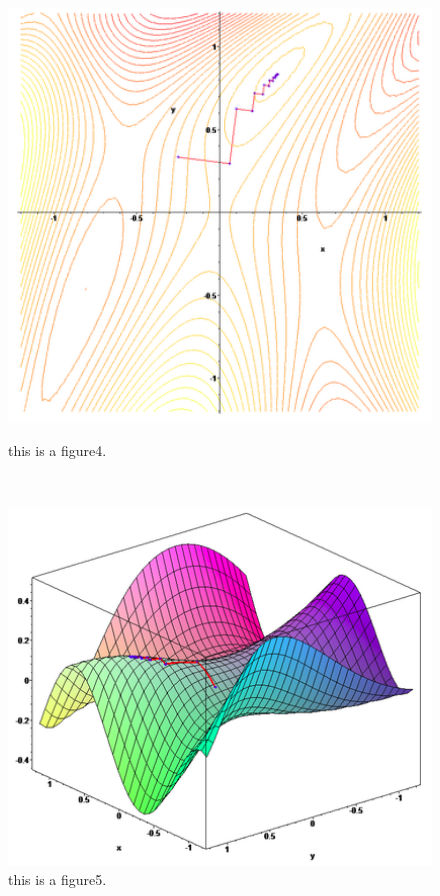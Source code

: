 \documentclass[12pt,a4paper]{article}
\begin{document}
\begin{figure}[ht]
\begin{minipage}[t]{0.4\linewidth}%
\centering     %
\includegraphics[width=1.2\textwidth]{./figures/Figure_4.png}
\caption{this is a figure4.}%
\label{fig:liuchengtu1}%
\end{minipage} 
\hfill
\begin{minipage}[t]{0.4\linewidth}
\centering
\includegraphics[width=1.2\textwidth]{./figures/Figure_5.png}
\caption{this is a figure5.}%
\label{fig:liuchengtu2}
\end{minipage}
\end{figure}























\cite{tam19912d}

\end{document}
